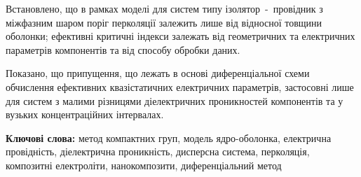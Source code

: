 \documentclass[twoside,a4paper,14pt]{vakaref}
\begin{document}
Встановлено, що в рамках моделі для систем типу ізолятор~-~провідник з міжфазним шаром поріг перколяції залежить лише від відносної товщини оболонки; ефективні критичні індекси залежать від геометричних та електричних параметрів компонентів та від способу обробки даних. 

Показано, що припущення, що лежать в основі диференціальної схеми обчислення ефективних квазістатичних електричних параметрів, застосовні лише для систем з малими різницями діелектричних проникностей компонентів та у вузьких концентраційних інтервалах.

\vskip 10pt
\textbf{Ключові слова:} метод компактних груп, модель ядро-оболонка, електрична провідність, діелектрична проникність, дисперсна система, перколяція, композитні електроліти, нанокомпозити, диференціальний метод


\bigskip
\end{document}
